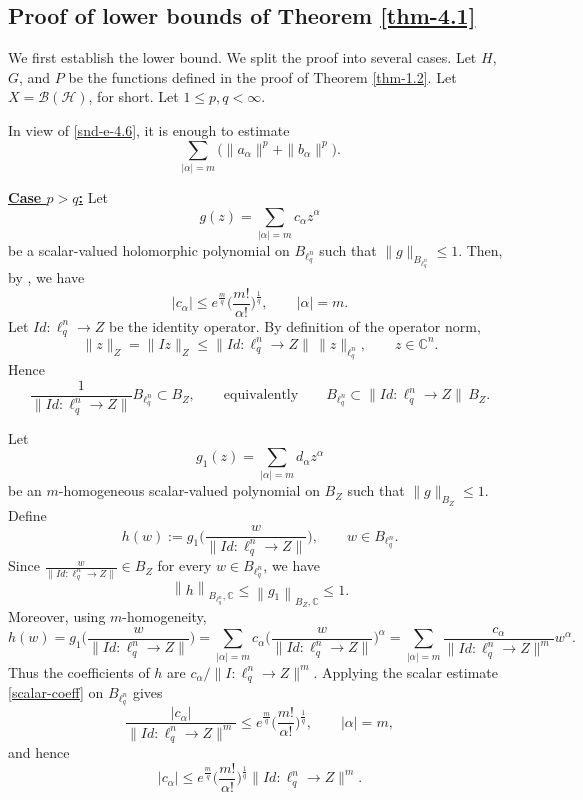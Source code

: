 \documentclass[a4paper,11pt, reqno]{amsart}
\theoremstyle{definition}
\newcommand{\norm}[1]{\left\lVert#1\right\rVert}
\begin{document}
\subsection{Proof of lower bounds of Theorem \ref{thm-4.1}}
	We first establish the lower bound. We split the proof into several cases. 
	Let $H$, $G$, and $P$ be the functions defined in the proof of Theorem \ref{thm-1.2}. Let $X=\mathcal{B}(\mathcal{H})$, for short. Let $1 \leq p,q < \infty$.
	
	\medskip
	\noindent
	In view of \eqref{snd-e-4.6}, it is enough to estimate
	\[
	\sum_{|\alpha|=m}\big(\|a_\alpha\|^p+\|b_\alpha\|^p\big).
	\]
	
	\medskip
	\noindent
\underline{\textbf{Case $p >q$:}}
	Let
	\[
	g(z)=\sum_{|\alpha|=m} c_\alpha z^\alpha
	\]
	be a scalar-valued holomorphic polynomial on $B_{\ell_q^n}$ such that
	$\|g\|_{B_{\ell_q^n}}\le 1$. Then, by \cite[(3
	.7), p. 24]{defant-2006}, we have
	\begin{equation}\label{scalar-coeff}
		|c_\alpha|
		\le e^{\frac m q}\Big(\frac{m!}{\alpha!}\Big)^{\frac1q},
		\qquad |\alpha|=m.
	\end{equation}
	\noindent
	Let 
	$Id:\ell_q^n\longrightarrow Z$
	be the identity operator. By definition of the operator norm,
	\[
	\|z\|_Z=\|Iz\|_Z\le \|Id:\ell_q^n\to Z\|\,\|z\|_{\ell_q^n},
	\qquad z\in\mathbb C^n.
	\]
	Hence
	\[
	\frac{1}{\|Id:\ell_q^n\to Z\|}B_{\ell_q^n}\subset B_Z,
	\qquad\text{equivalently}\qquad
	B_{\ell_q^n}\subset \|Id:\ell_q^n\to Z\|\, B_Z.
	\]
	
	Let
	\[
	g_1(z)=\sum_{|\alpha|=m} d_\alpha z^\alpha
	\]
	be an $m$-homogeneous scalar-valued polynomial on $B_Z$ such that
	$\|g\|_{B_Z}\le 1$. Define
	\[
	h(w):=g_1\Big(\frac{w}{\|Id:\ell_q^n\to Z\|}\Big),
	\qquad w\in B_{\ell_q^n}.
	\]
	Since $\frac{w}{\|Id:\ell_q^n\to Z\|}\in B_Z$ for every $w\in B_{\ell_q^n}$,
	we have
	\[
	\norm{h}_{B_{\ell_q^n},\mathbb{C}}\le \norm{g_1}_{B_Z,\mathbb{C}}\le 1.
	\]
	Moreover, using $m$-homogeneity,
	\[
	h(w)=g_1\Big(\frac{w}{\|Id:\ell_q^n\to Z\|}\Big)
	=\sum_{|\alpha|=m} c_\alpha 
	\Big(\frac{w}{\|Id:\ell_q^n\to Z\|}\Big)^\alpha
	=\sum_{|\alpha|=m}\frac{c_\alpha}{\|Id:\ell_q^n\to Z\|^m}w^\alpha.
	\]
	Thus the coefficients of $h$ are $c_\alpha/\|I:\ell_q^n\to Z\|^m$.
	Applying the scalar estimate \eqref{scalar-coeff} on $B_{\ell_q^n}$ gives
	\[
	\frac{|c_\alpha|}{\|Id:\ell_q^n\to Z\|^m}
	\le e^{\frac mq}\Big(\frac{m!}{\alpha!}\Big)^{\frac1q},
	\qquad |\alpha|=m,
	\]
	and hence
	\begin{equation}\label{scalar-Z}
		|c_\alpha|
		\le e^{\frac mq}\Big(\frac{m!}{\alpha!}\Big)^{\frac1q}
		\|Id:\ell_q^n\to Z\|^m.
	\end{equation}
	
\end{document}
